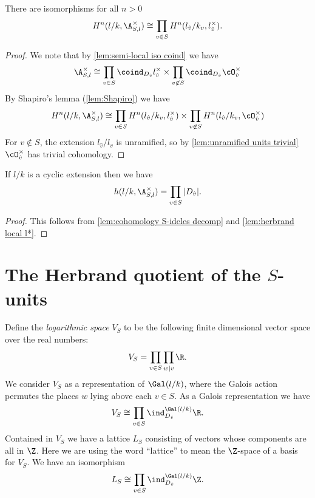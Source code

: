 \begin{lemma} \label{lem:cohomology S-ideles decomp}
	There are isomorphisms for all $n > 0$
	\[
		H^n(l/k, \A_{S,l}^\times)
		\cong
		\prod_{v \in S} H^n(l_{\hat v} / k_v, l_{\hat v}^\times).
	\]
\end{lemma}

\begin{proof}
	We note that by \ref{lem:semi-local iso coind} we have
	\[
		\A_{S,l}^\times \cong \prod_{v \in S} \coind_{D_{\hat v}} l_{\hat v}^\times
		\times
		\prod_{v \not\in S} \coind_{D_{\hat v}} \cO_{\hat v}^\times
	\]
	By Shapiro's lemma (\ref{lem:Shapiro}) we have
	\[
		H^n(l/k,\A_{S,l}^\times) \cong
		\prod_{v \in S} H^n(l_{\hat v}/k_v , l_{\hat v}^\times)
		\times
		\prod_{v \not\in S} H^n(l_{\hat v}/k_v , \cO_{\hat v}^\times)
	\]
	For $v \not\in S$, the extension $l_{\hat{v}}/l_v$ is unramified, so
	by \ref{lem:unramified units trivial} $\cO_{\hat v}^\times$ has trivial cohomology.
\end{proof}


\begin{lemma} \label{lem:herbrand S-ideles}
	If $l/k$ is a cyclic extension then we have
	\[
		h(l/k, \A_{S,l} ^\times )
		=
		\prod_{v \in S} |D_{\hat v}|.
	\]
\end{lemma}

\begin{proof}
	This follows from \ref{lem:cohomology S-ideles decomp} and
	\ref{lem:herbrand local l*}.
\end{proof}





\section{The Herbrand quotient of the \texorpdfstring{$S$}{S}-units}

Define the \emph{logarithmic space} $V_S$ to be the following finite dimensional vector space
over the real numbers:
\[
	V_S = \prod_{v \in S} \prod_{w | v} \R.
\]
We consider $V_S$ as a representation of $\Gal(l/k)$, where the Galois action
permutes the places $w$ lying above each $v \in S$.
As a Galois representation we have
\[
	V_S \cong \prod_{v \in S} \ind_{D_{\hat v}}^{\Gal(l/k)} \R.
\]
Contained in $V_S$ we have a lattice $L_S$ consisting of vectors whose components are all in $\Z$.
Here we are using the word ``lattice'' to mean the $\Z$-space of a basis for $V_S$.
We have an isomorphism
\[
	L_S \cong \prod_{v \in S} \ind_{D_{\hat v}}^{\Gal(l/k)} \Z.
\]

